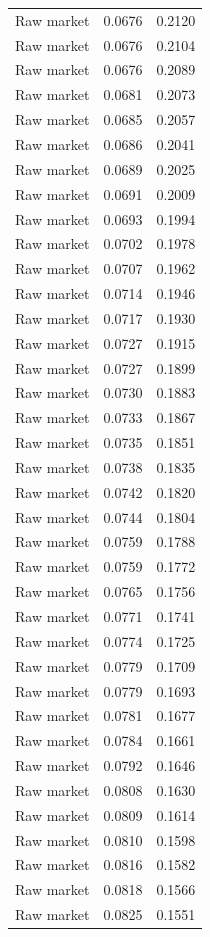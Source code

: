 \begin{table}[htbp]
\begin{tabular}{lll}
Raw market & 0.0676 & 0.2120 \\
Raw market & 0.0676 & 0.2104 \\
Raw market & 0.0676 & 0.2089 \\
Raw market & 0.0681 & 0.2073 \\
Raw market & 0.0685 & 0.2057 \\
Raw market & 0.0686 & 0.2041 \\
Raw market & 0.0689 & 0.2025 \\
Raw market & 0.0691 & 0.2009 \\
Raw market & 0.0693 & 0.1994 \\
Raw market & 0.0702 & 0.1978 \\
Raw market & 0.0707 & 0.1962 \\
Raw market & 0.0714 & 0.1946 \\
Raw market & 0.0717 & 0.1930 \\
Raw market & 0.0727 & 0.1915 \\
Raw market & 0.0727 & 0.1899 \\
Raw market & 0.0730 & 0.1883 \\
Raw market & 0.0733 & 0.1867 \\
Raw market & 0.0735 & 0.1851 \\
Raw market & 0.0738 & 0.1835 \\
Raw market & 0.0742 & 0.1820 \\
Raw market & 0.0744 & 0.1804 \\
Raw market & 0.0759 & 0.1788 \\
Raw market & 0.0759 & 0.1772 \\
Raw market & 0.0765 & 0.1756 \\
Raw market & 0.0771 & 0.1741 \\
Raw market & 0.0774 & 0.1725 \\
Raw market & 0.0779 & 0.1709 \\
Raw market & 0.0779 & 0.1693 \\
Raw market & 0.0781 & 0.1677 \\
Raw market & 0.0784 & 0.1661 \\
Raw market & 0.0792 & 0.1646 \\
Raw market & 0.0808 & 0.1630 \\
Raw market & 0.0809 & 0.1614 \\
Raw market & 0.0810 & 0.1598 \\
Raw market & 0.0816 & 0.1582 \\
Raw market & 0.0818 & 0.1566 \\
Raw market & 0.0825 & 0.1551 \\

\end{tabular}
\end{table}

